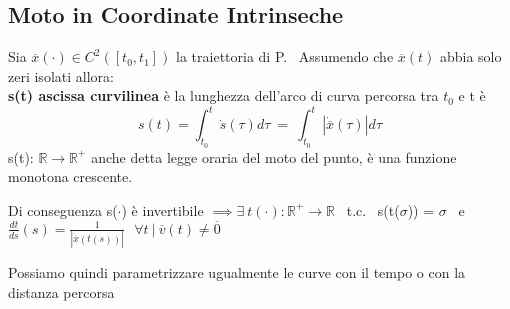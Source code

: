 \documentclass{article}
\begin{document}
\pagebreak %



\subsection{Moto in Coordinate Intrinseche}
%
Sia $\overline{x}(\cdot) \in C^2([t_0,t_1])$ la traiettoria di P. \ Assumendo che $\overline{x}(t)$ abbia solo zeri isolati allora: \\ 
\textbf{s(t) ascissa curvilinea} è la lunghezza dell'arco di curva percorsa tra $t_0$ e t è
\begin{equation*}
    s(t)=\int_{t_0}^t \dot{s}(\tau) d\tau \ = \ \int_{t_0}^t |\dot{\overline{x}}(\tau)| d\tau
\end{equation*}
s(t): $\mathbb{R}\rightarrow\mathbb{R}^+$ anche detta legge oraria del moto del punto, è una funzione monotona crescente.

Di conseguenza s($\cdot$) è invertibile $\implies \exists \ t(\cdot):\mathbb{R}^+\rightarrow\mathbb{R}$ \ t.c. \ s(t($\sigma$)) = $\sigma$ \ e \ $\frac{dt}{ds}(s)= \frac{1}{|\dot{\overline{x}}(t(s))|}\ \ \ \forall t \ |\ \overline{v}(t)\neq \overline{0} $

Possiamo quindi parametrizzare ugualmente le curve con il tempo o con la distanza percorsa
\end{document}
